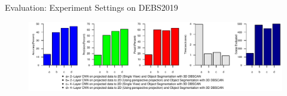 \documentclass[9pt]{beamer}
\begin{document}
\begin{frame}[fragile]{Evaluation: Experiment Settings on DEBS2019 }
\begin{figure}
	\centering
	\includegraphics[width=\textwidth]{images/evaluation2.pdf}

\end{figure}
\end{frame}

\end{document}
